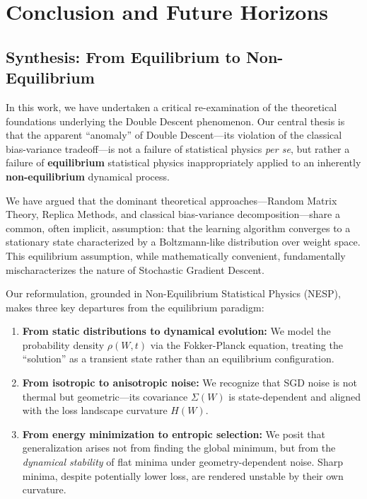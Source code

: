 \documentclass[
  journal=largetwo,
  year=2025,
  volume=37,
]{cup-journal}
\begin{document}
\section{Conclusion and Future Horizons}

\subsection{Synthesis: From Equilibrium to Non-Equilibrium}

In this work, we have undertaken a critical re-examination of the theoretical foundations underlying the Double Descent phenomenon. Our central thesis is that the apparent ``anomaly'' of Double Descent---its violation of the classical bias-variance tradeoff---is not a failure of statistical physics \textit{per se}, but rather a failure of \textbf{equilibrium} statistical physics inappropriately applied to an inherently \textbf{non-equilibrium} dynamical process.

We have argued that the dominant theoretical approaches---Random Matrix Theory, Replica Methods, and classical bias-variance decomposition---share a common, often implicit, assumption: that the learning algorithm converges to a stationary state characterized by a Boltzmann-like distribution over weight space. This equilibrium assumption, while mathematically convenient, fundamentally mischaracterizes the nature of Stochastic Gradient Descent.

Our reformulation, grounded in Non-Equilibrium Statistical Physics (NESP), makes three key departures from the equilibrium paradigm:

\begin{enumerate}
    \item \textbf{From static distributions to dynamical evolution:} We model the probability density $\rho(W,t)$ via the Fokker-Planck equation, treating the ``solution'' as a transient state rather than an equilibrium configuration.
    
    \item \textbf{From isotropic to anisotropic noise:} We recognize that SGD noise is not thermal but geometric---its covariance $\Sigma(W)$ is state-dependent and aligned with the loss landscape curvature $H(W)$.
    
    \item \textbf{From energy minimization to entropic selection:} We posit that generalization arises not from finding the global minimum, but from the \textit{dynamical stability} of flat minima under geometry-dependent noise. Sharp minima, despite potentially lower loss, are rendered unstable by their own curvature.
\end{enumerate}
\end{document}

